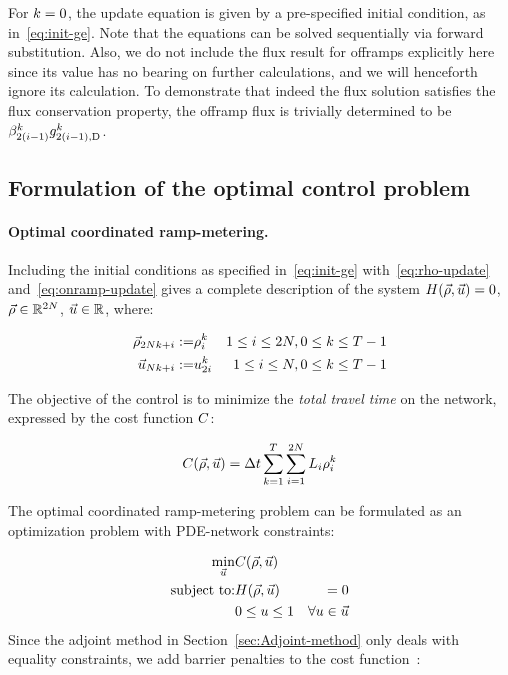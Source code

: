 For $k=0$, the update equation is given by a pre-specified initial
condition, as in~\eqref{eq:init-ge}. Note that the equations can
be solved sequentially via forward substitution. Also, we do not include
the flux result for offramps explicitly here since its value has no
bearing on further calculations, and we will henceforth ignore its
calculation. To demonstrate that indeed the flux solution satisfies
the flux conservation property, the offramp flux is trivially determined
to be $\splitratio_{2\left(\link-1\right)}^{\tind}\fout{2\left(\link-1\right)}{\tind}$.


\subsection{Formulation of the optimal control problem}


\paragraph{Optimal coordinated ramp-metering.}

Including the initial conditions as specified in~\eqref{eq:init-ge}
with~\eqref{eq:rho-update} and~\eqref{eq:onramp-update} gives
a complete description of the system $\sys\left(\state,\control\right)=0$,
$\vec{\rho}\in\mathbb{R}^{2N}$, $\vec{u}\in\mathbb{R}$, where:

\begin{eqnarray*}
\vec{\rho}_{2Nk+i}:= & \rho_{i}^{k} & 1\le i\le2N,0\le k\le T-1\\
\vec{u}_{Nk+i}:= & u_{2i}^{k} & 1\le i\le N,0\le k\le T-1
\end{eqnarray*}


The objective of the control is to minimize the \emph{total travel
time }on the network, expressed by the cost function $C$:

\[
\cost\left(\state,\control\right)=\Delta t\sum_{k=1}^{T}\sum_{i=1}^{2\nlinks}L_{i}\densitydiscrete{\link}{\tind}
\]


The optimal coordinated ramp-metering problem can be formulated as
an optimization problem with PDE-network constraints:

\begin{eqnarray}
\min_{\control} & \cost\left(\state,\control\right)\label{eq:full}\\
\text{subject to:} & \sys\left(\state,\control\right) & =0\nonumber \\
 & 0\le\convar\le1 & \forall\convar\in\control\nonumber 
\end{eqnarray}
Since the adjoint method in Section~\ref{sec:Adjoint-method} only
deals with equality constraints, we add barrier penalties to the cost
function~\cite{Boyd2010,Bayen2006}:

